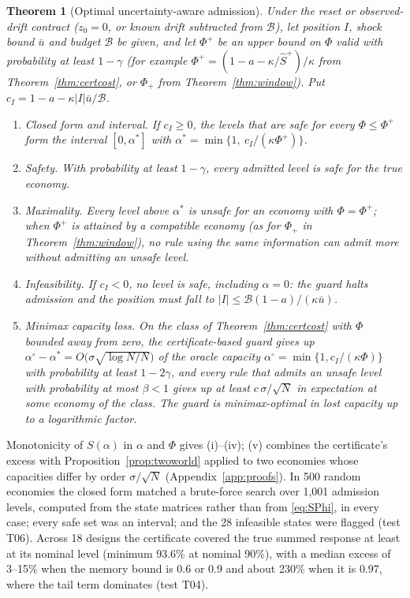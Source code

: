\documentclass[12pt]{article}
\newtheorem{theorem}{Theorem}[section]
\theoremstyle{definition}
\theoremstyle{remark}
\begin{document}
\begin{theorem}[Optimal uncertainty-aware admission]\label{thm:robustguard}
Under the reset or observed-drift contract ($z_0=0$, or known drift subtracted from $\mathcal B$), let position $I$, shock bound $\bar u$ and budget $\mathcal B$ be given, and let $\Phi^+$ be an upper bound on $\Phi$ valid with probability at least $1-\gamma$ (for example $\Phi^+=(1-a-\kappa/\hat S^+)/\kappa$ from Theorem~\ref{thm:certcost}, or $\Phi_+$ from Theorem~\ref{thm:window}). Put $c_I=1-a-\kappa|I|\bar u/\mathcal B$.
\begin{enumerate}[label=(\roman*)]
\item \emph{Closed form and interval.} If $c_I\ge0$, the levels that are safe for every $\Phi\le\Phi^+$ form the interval $[0,\alpha^*]$ with $\alpha^*=\min\{1,\ c_I/(\kappa\Phi^+)\}$.
\item \emph{Safety.} With probability at least $1-\gamma$, every admitted level is safe for the true economy.
\item \emph{Maximality.} Every level above $\alpha^*$ is unsafe for an economy with $\Phi=\Phi^+$; when $\Phi^+$ is attained by a compatible economy (as for $\Phi_+$ in Theorem~\ref{thm:window}), no rule using the same information can admit more without admitting an unsafe level.
\item \emph{Infeasibility.} If $c_I<0$, no level is safe, including $\alpha=0$: the guard halts admission and the position must fall to $|I|\le\mathcal B(1-a)/(\kappa\bar u)$.
\item \emph{Minimax capacity loss.} On the class of Theorem~\ref{thm:certcost} with $\Phi$ bounded away from zero, the certificate-based guard gives up $\alpha^\circ-\alpha^*=O\bigl(\sigma\sqrt{\log N/N}\bigr)$ of the oracle capacity $\alpha^\circ=\min\{1,c_I/(\kappa\Phi)\}$ with probability at least $1-2\gamma$, and every rule that admits an unsafe level with probability at most $\beta<1$ gives up at least $c\,\sigma/\sqrt N$ in expectation at some economy of the class. The guard is minimax-optimal in lost capacity up to a logarithmic factor.
\end{enumerate}
\end{theorem}

Monotonicity of $S(\alpha)$ in $\alpha$ and $\Phi$ gives (i)--(iv); (v) combines the certificate's excess with Proposition~\ref{prop:twoworld} applied to two economies whose capacities differ by order $\sigma/\sqrt N$ (Appendix~\ref{app:proofs}). In 500 random economies the closed form matched a brute-force search over 1{,}001 admission levels, computed from the state matrices rather than from \eqref{eq:SPhi}, in every case; every safe set was an interval; and the 28 infeasible states were flagged (test T06). Across 18 designs the certificate covered the true summed response at least at its nominal level (minimum 93.6\% at nominal 90\%), with a median excess of 3--15\% when the memory bound is $0.6$ or $0.9$ and about 230\% when it is $0.97$, where the tail term dominates (test T04).
\end{document}
